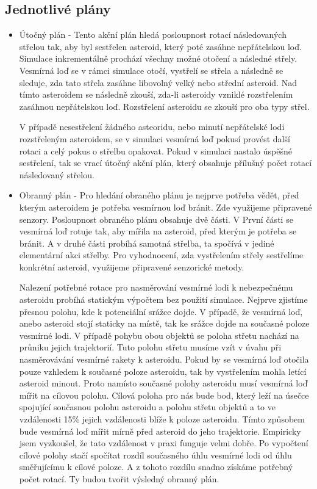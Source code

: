 \subsection{Jednotlivé plány}
\begin{itemize}
    \item Útočný plán - 
        Tento akční plán hledá posloupnost rotací následovaných střelou tak, aby byl sestřelen asteroid, který poté zasáhne nepřátelskou loď.        
        Simulace inkrementálně prochází všechny možné otočení a následné střely. Vesmírná loď se v rámci simulace otočí, vystřelí se střela a následně se sleduje, zda tato střela zasáhne libovolný velký nebo střední asteroid.
        Nad tímto asteroidem se následně zkouší, zda-li asteroidy vzniklé rozstřelením zasáhnou nepřátelskou loď. Rozstřelení asteroidu se zkouší pro oba typy střel.
        \par
        V případě nesestřelení žádného asteoridu, nebo minutí nepřátelské lodi rozstřeleným asteroidem, se v simulaci vesmírná loď pokusí provést další rotaci a celý pokus o střelbu opakovat.
        Pokud v simulaci nastalo úspěšné sestřelení, tak se vrací útočný akční plán, který obsahuje přílušný počet rotací následovaný střelou.
    
    \item Obranný plán - Pro hledání obraného plánu je nejprve potřeba vědět, před kterým asteroidem je potřeba vesmírnou loď bránit. 
        Zde využijeme připravené senzory. Posloupnost obraného plánu obsahuje dvě části. V První části se vesmírná loď rotuje tak, aby mířila na asteroid, před kterým je potřeba se bránit.
        A v druhé části probíhá samotná střelba, ta spočívá v jediné elementární akci střelby. Pro vyhodnocení, zda vystřelením střely sestřelíme konkrétní asteroid, využijeme připravené senzorické metody.
        \par
        Nalezení potřebné rotace pro nasměrování vesmírné lodi k nebezpečnému asteroidu probíhá statickým výpočtem bez použití simulace.
        Nejprve zjistíme přesnou polohu, kde k potenciální srážce dojde. V případě, že vesmírná loď, anebo asteroid stojí staticky na místě, tak ke srážce dojde na současné poloze vesmírné lodi.
        V případě pohybu obou objektů se poloha střetu nachází na průniku jejich trajektorií. Tuto polohu střetu musíme vzít v úvahu při nasměrovávání vesmírné rakety k asteroidu.        
        Pokud by se vesmírná loď otočila pouze vzhledem k současné poloze asteroidu, tak by vystřelením mohla letící asteroid minout.
        Proto namísto současné polohy asteroidu musí vesmírná loď mířit na cílovou polohu.
        Cílová poloha pro nás bude bod, který leží na úsečce spojující současnou polohu asteroidu a polohu střetu objektů a to ve vzdálenosti 15\% jejich vzdálenosti blíže k poloze asteroidu. 
        Tímto způsobem bude vesmírná loď mířit mírně před asteroid do jeho trajektorie. Empiricky jsem vyzkoušel, že tato vzdálenost v praxi funguje velmi dobře.
        Po vypočtení cílové polohy stačí spočítat rozdíl současného úhlu vesmírné lodi od úhlu směřujícímu k cílové poloze. A z tohoto rozdílu snadno získáme potřebný počet rotací. Ty budou tvořit výsledný obranný plán.
        

\end{itemize}
